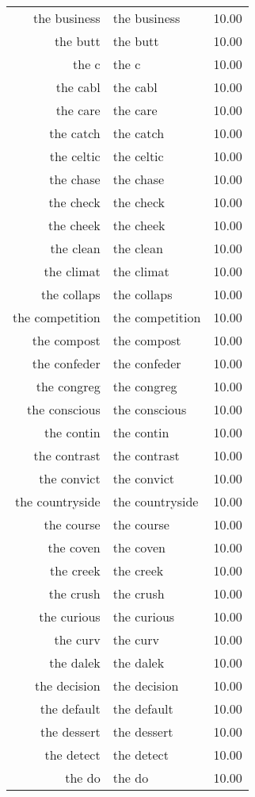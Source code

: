 \begin{table}[ht]
\begin{tabular}{rlr}
  the business & the business & 10.00 \\ 
  the butt & the butt & 10.00 \\ 
  the c & the c & 10.00 \\ 
  the cabl & the cabl & 10.00 \\ 
  the care & the care & 10.00 \\ 
  the catch & the catch & 10.00 \\ 
  the celtic & the celtic & 10.00 \\ 
  the chase & the chase & 10.00 \\ 
  the check & the check & 10.00 \\ 
  the cheek & the cheek & 10.00 \\ 
  the clean & the clean & 10.00 \\ 
  the climat & the climat & 10.00 \\ 
  the collaps & the collaps & 10.00 \\ 
  the competition & the competition & 10.00 \\ 
  the compost & the compost & 10.00 \\ 
  the confeder & the confeder & 10.00 \\ 
  the congreg & the congreg & 10.00 \\ 
  the conscious & the conscious & 10.00 \\ 
  the contin & the contin & 10.00 \\ 
  the contrast & the contrast & 10.00 \\ 
  the convict & the convict & 10.00 \\ 
  the countryside & the countryside & 10.00 \\ 
  the course & the course & 10.00 \\ 
  the coven & the coven & 10.00 \\ 
  the creek & the creek & 10.00 \\ 
  the crush & the crush & 10.00 \\ 
  the curious & the curious & 10.00 \\ 
  the curv & the curv & 10.00 \\ 
  the dalek & the dalek & 10.00 \\ 
  the decision & the decision & 10.00 \\ 
  the default & the default & 10.00 \\ 
  the dessert & the dessert & 10.00 \\ 
  the detect & the detect & 10.00 \\ 
  the do & the do & 10.00 \\ 

\end{tabular}
\end{table}
